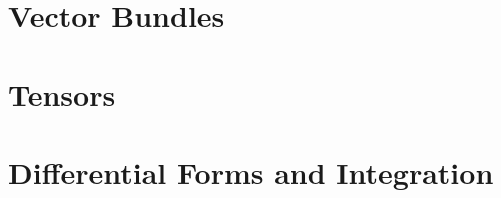 \documentclass{kumikoNotes}
\begin{document}
\chapter{Vector Bundles}
    
    

\chapter{Tensors}
    
    
\chapter{Differential Forms and Integration}
    
    
    
    
    
\appendix

%
\end{document}
